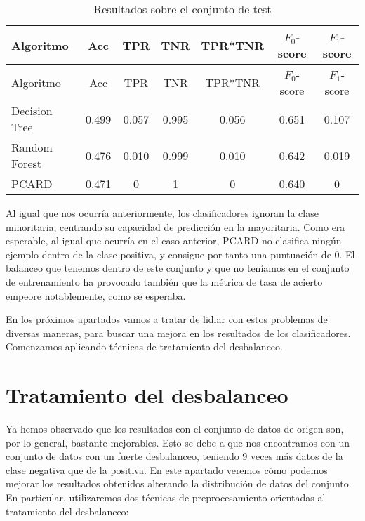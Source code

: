 \documentclass[
  a4paper,
,tablecaptionabove
]{scrartcl}
\begin{document}
\begin{longtable}[]{@{}lcccccc@{}}
\caption{Resultados sobre el conjunto de test}\tabularnewline
\toprule
Algoritmo & Acc & TPR & TNR & TPR*TNR & \(F_0\)-score &
\(F_1\)-score\tabularnewline
\midrule
\endfirsthead
\toprule
Algoritmo & Acc & TPR & TNR & TPR*TNR & \(F_0\)-score &
\(F_1\)-score\tabularnewline
\midrule
\endhead
Decision Tree & 0.499 & 0.057 & 0.995 & 0.056 & 0.651 &
0.107\tabularnewline
Random Forest & 0.476 & 0.010 & 0.999 & 0.010 & 0.642 &
0.019\tabularnewline
PCARD & 0.471 & 0 & 1 & 0 & 0.640 & 0\tabularnewline
\bottomrule
\end{longtable}

Al igual que nos ocurría anteriormente, los clasificadores ignoran la
clase minoritaria, centrando su capacidad de predicción en la
mayoritaria. Como era esperable, al igual que ocurría en el caso
anterior, PCARD no clasifica ningún ejemplo dentro de la clase positiva,
y consigue por tanto una puntuación de 0. El balanceo que tenemos dentro
de este conjunto y que no teníamos en el conjunto de entrenamiento ha
provocado también que la métrica de tasa de acierto empeore
notablemente, como se esperaba.

En los próximos apartados vamos a tratar de lidiar con estos problemas
de diversas maneras, para buscar una mejora en los resultados de los
clasificadores. Comenzamos aplicando técnicas de tratamiento del
desbalanceo.

\hypertarget{tratamiento-del-desbalanceo}{%
\section{Tratamiento del
desbalanceo}\label{tratamiento-del-desbalanceo}}

Ya hemos observado que los resultados con el conjunto de datos de origen
son, por lo general, bastante mejorables. Esto se debe a que nos
encontramos con un conjunto de datos con un fuerte desbalanceo, teniendo
9 veces más datos de la clase negativa que de la positiva. En este
apartado veremos cómo podemos mejorar los resultados obtenidos alterando
la distribución de datos del conjunto. En particular, utilizaremos dos
técnicas de preprocesamiento orientadas al tratamiento del desbalanceo:
\end{document}
